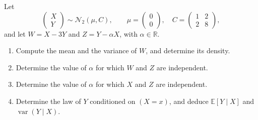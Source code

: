 \begin{example}\label{exa:gc-two-combinations}
Let
\[
  \begin{pmatrix}X\\Y\end{pmatrix}\sim\mathcal N_2\left(\mu,C\right),\qquad
  \mu=\begin{pmatrix}0\\0\end{pmatrix},\quad C=\begin{pmatrix}1&2\\2&8\end{pmatrix},
\]
and let $W=X-3Y$ and $Z=Y-\alpha X$, with $\alpha\in\mathbb R$.
\begin{enumerate}[label=\alph*)]
  \item Compute the mean and the variance of $W$, and determine its density.
  \item Determine the value of $\alpha$ for which $W$ and $Z$ are independent.
  \item Determine the value of $\alpha$ for which $X$ and $Z$ are independent.
  \item Determine the law of $Y$ conditioned on $(X=x)$, and deduce $\mathbb E[Y\mid X]$ and
    $\operatorname{var}(Y\mid X)$.
\end{enumerate}


\end{example}

